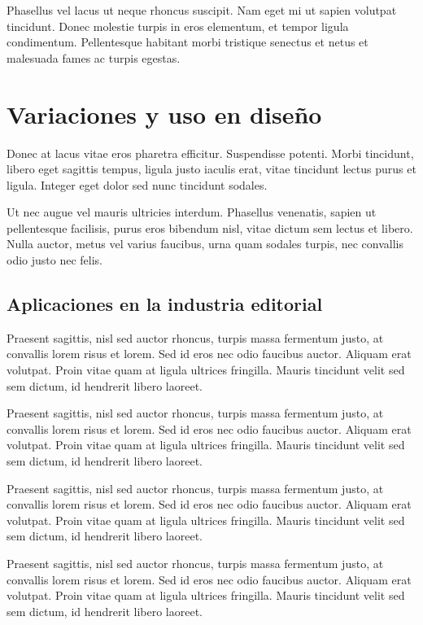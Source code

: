 Phasellus vel lacus ut neque rhoncus suscipit. Nam eget mi ut sapien volutpat tincidunt. Donec molestie turpis in eros elementum, et tempor ligula condimentum. Pellentesque habitant morbi tristique senectus et netus et malesuada fames ac turpis egestas.

\section{Variaciones y uso en diseño}

Donec at lacus vitae eros pharetra efficitur. Suspendisse potenti. Morbi tincidunt, libero eget sagittis tempus, ligula justo iaculis erat, vitae tincidunt lectus purus et ligula. Integer eget dolor sed nunc tincidunt sodales.

Ut nec augue vel mauris ultricies interdum. Phasellus venenatis, sapien ut pellentesque facilisis, purus eros bibendum nisl, vitae dictum sem lectus et libero. Nulla auctor, metus vel varius faucibus, urna quam sodales turpis, nec convallis odio justo nec felis.

\subsection{Aplicaciones en la industria editorial}

Praesent sagittis, nisl sed auctor rhoncus, turpis massa fermentum justo, at convallis lorem risus et lorem. Sed id eros nec odio faucibus auctor. Aliquam erat volutpat. Proin vitae quam at ligula ultrices fringilla. Mauris tincidunt velit sed sem dictum, id hendrerit libero laoreet.

Praesent sagittis, nisl sed auctor rhoncus, turpis massa fermentum justo, at convallis lorem risus et lorem. Sed id eros nec odio faucibus auctor. Aliquam erat volutpat. Proin vitae quam at ligula ultrices fringilla. Mauris tincidunt velit sed sem dictum, id hendrerit libero laoreet.

Praesent sagittis, nisl sed auctor rhoncus, turpis massa fermentum justo, at convallis lorem risus et lorem. Sed id eros nec odio faucibus auctor. Aliquam erat volutpat. Proin vitae quam at ligula ultrices fringilla. Mauris tincidunt velit sed sem dictum, id hendrerit libero laoreet.

Praesent sagittis, nisl sed auctor rhoncus, turpis massa fermentum justo, at convallis lorem risus et lorem. Sed id eros nec odio faucibus auctor. Aliquam erat volutpat. Proin vitae quam at ligula ultrices fringilla. Mauris tincidunt velit sed sem dictum, id hendrerit libero laoreet.

